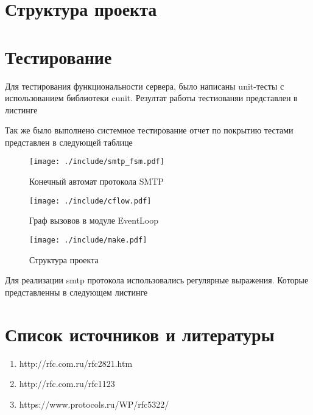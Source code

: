 \documentclass[a4paper,12pt]{extreport}
\begin{document}
	\section{Структура проекта}
	
	\section{Тестирование}
		Для тестирования функциональности сервера, было написаны unit-тесты
		с использованием библиотеки cunit. Резултат работы тестиованяи представлен
		в листинге 
		
		Так же было выполнено системное тестирование
		отчет по покрытию тестами представлен в следующей таблице
		\begin{landscape}
			
		\end{landscape}

	\begin{figure}
	\centering
	\texttt{[image: ./include/smtp\_fsm.pdf]}
	\caption{Конечный автомат протокола SMTP}
	\label{fig:smtp_fsm}
	\end{figure}

	\begin{figure}
	\centering
	\texttt{[image: ./include/cflow.pdf]}
	\caption{Граф вызовов в модуле EventLoop}
	\label{fig:event}
	\end{figure}

	\begin{figure}
	\centering
	\texttt{[image: ./include/make.pdf]}
	\caption{Структура проекта}
	\label{fig:make_server}
	\end{figure}

	Для реализации smtp протокола использовались регулярные выражения. Которые представленны в следующем листинге
	

	\section{Список источников и литературы}
	\begin{enumerate}
		\item http://rfc.com.ru/rfc2821.htm
		\item http://rfc.com.ru/rfc1123
		\item https://www.protocols.ru/WP/rfc5322/
	\end{enumerate}
\end{document}
